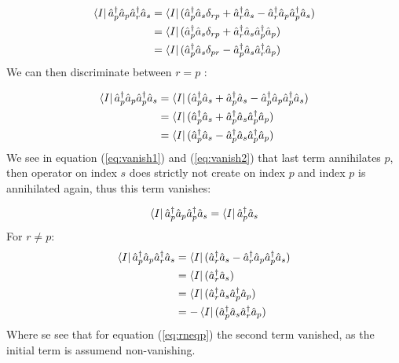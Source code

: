 \documentclass[12p]{article}
\begin{document}
\begin{align}
  \bra{I}  \hat{a}^\dagger_p \hat{a}_p \hat{a}^\dagger_r \hat{a}_s & =  \bra{I} (\hat{a}^\dagger_p \hat{a}_s \delta_{rp} + \hat{a}^\dagger_r  \hat{a}_s - \hat{a}^\dagger_r \hat{a}_p \hat{a}^\dagger_p \hat{a}_s) \\
  & =   \bra{I} (\hat{a}^\dagger_p \hat{a}_s \delta_{rp} + \hat{a}^\dagger_r \hat{a}_s \hat{a}^\dagger_p \hat{a}_p) \\
  & =   \bra{I} (\hat{a}^\dagger_p \hat{a}_s \delta_{pr} - \hat{a}^\dagger_p \hat{a}_s \hat{a}^\dagger_r \hat{a}_p)
\end{align}
We can then discriminate between $r = p$ :

\begin{align}
    \bra{I} \hat{a}^\dagger_p \hat{a}_p \hat{a}^\dagger_p \hat{a}_s & =   \bra{I} (\hat{a}^\dagger_p \hat{a}_s + \hat{a}^\dagger_p \hat{a}_s - \hat{a}^\dagger_p \hat{a}_p \hat{a}^\dagger_p \hat{a}_s ) \\
  & =   \bra{I} (\hat{a}^\dagger_p \hat{a}_s + \hat{a}^\dagger_p \hat{a}_s \hat{a}^\dagger_p \hat{a}_p) \label{eq:vanish1} \\
  & =   \bra{I} (\hat{a}^\dagger_p \hat{a}_s - \hat{a}^\dagger_p \hat{a}_s \hat{a}^\dagger_p \hat{a}_p) \label{eq:vanish2}
\end{align}
We see in equation (\ref{eq:vanish1}) and (\ref{eq:vanish2}) that last term annihilates $p$, then operator on index $s$ does strictly not create on index $p$ and index $p$ is annihilated again, thus this term vanishes:

\begin{equation}
 \bra{I}  \hat{a}^\dagger_p \hat{a}_p \hat{a}^\dagger_p \hat{a}_s = \bra{I} \hat{a}^\dagger_p \hat{a}_s
\end{equation}
For $r \neq p$:
\begin{align}
    \bra{I} \hat{a}^\dagger_p \hat{a}_p \hat{a}^\dagger_r \hat{a}_s & =   \bra{I} ( \hat{a}^\dagger_r  \hat{a}_s - \hat{a}^\dagger_r \hat{a}_p \hat{a}^\dagger_p \hat{a}_s ) \nonumber \\
  & =   \bra{I} (\hat{a}^\dagger_r  \hat{a}_s) \label{eq:rneqp}\\
  & =   \bra{I} ( \hat{a}^\dagger_r \hat{a}_s \hat{a}^\dagger_p \hat{a}_p) \\
  & = -   \bra{I} (\hat{a}^\dagger_p \hat{a}_s \hat{a}^\dagger_r \hat{a}_p)
\end{align}
Where se see that for equation (\ref{eq:rneqp}) the second term vanished, as the initial term is assumend non-vanishing.
\end{document}
